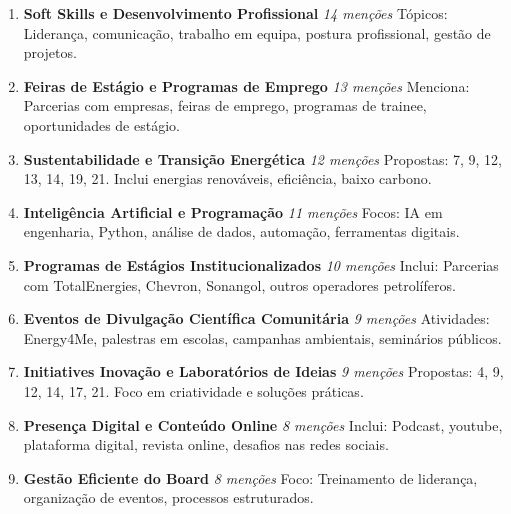 \documentclass[12pt,a4paper]{article}
\begin{document}
\begin{enumerate}[itemsep=0.3cm, font=\bfseries]
\item \textbf{Soft Skills e Desenvolvimento Profissional} \quad \textit{14 menções}
\newline Tópicos: Liderança, comunicação, trabalho em equipa, postura profissional, gestão de projetos.

\item \textbf{Feiras de Estágio e Programas de Emprego} \quad \textit{13 menções}
\newline Menciona: Parcerias com empresas, feiras de emprego, programas de trainee, oportunidades de estágio.

\item \textbf{Sustentabilidade e Transição Energética} \quad \textit{12 menções}
\newline Propostas: 7, 9, 12, 13, 14, 19, 21. Inclui energias renováveis, eficiência, baixo carbono.

\item \textbf{Inteligência Artificial e Programação} \quad \textit{11 menções}
\newline Focos: IA em engenharia, Python, análise de dados, automação, ferramentas digitais.

\item \textbf{Programas de Estágios Institucionalizados} \quad \textit{10 menções}
\newline Inclui: Parcerias com TotalEnergies, Chevron, Sonangol, outros operadores petrolíferos.

\item \textbf{Eventos de Divulgação Científica Comunitária} \quad \textit{9 menções}
\newline Atividades: Energy4Me, palestras em escolas, campanhas ambientais, seminários públicos.

\item \textbf{Initiatives Inovação e Laboratórios de Ideias} \quad \textit{9 menções}
\newline Propostas: 4, 9, 12, 14, 17, 21. Foco em criatividade e soluções práticas.

\item \textbf{Presença Digital e Conteúdo Online} \quad \textit{8 menções}
\newline Inclui: Podcast, youtube, plataforma digital, revista online, desafios nas redes sociais.

\item \textbf{Gestão Eficiente do Board} \quad \textit{8 menções}
\newline Foco: Treinamento de liderança, organização de eventos, processos estruturados.


\end{enumerate}
\end{document}
